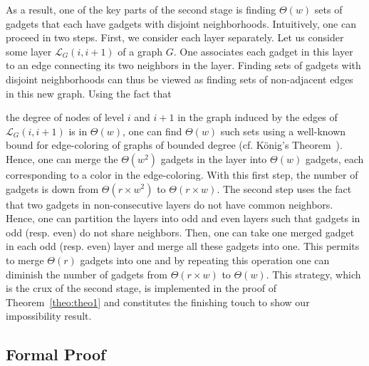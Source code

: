 \documentclass[11pt]{article}
\begin{document}
As a result, one of the key parts of the second stage is finding $\Theta(w)$ sets of gadgets that each have gadgets with disjoint neighborhoods. Intuitively, one can proceed in two steps. First, we consider each layer separately. Let us consider some layer $\mathcal{L}_G(i,i+1)$ of a graph $G$. One associates each gadget in this layer to an edge connecting its two neighbors in the layer. Finding sets of gadgets with disjoint neighborhoods can thus be viewed as finding sets of non-adjacent edges in this new graph. Using the fact that {the degree of nodes of level $i$ and $i+1$ in the graph induced by the edges of $\mathcal{L}_G(i,i+1)$ is in $\Theta(w)$, one can find $\Theta(w)$ such sets using a well-known bound for edge-coloring of graphs of bounded degree (cf. König's Theorem~\cite{konig1916}). Hence, one can merge the $\Theta(w^2)$ gadgets in the layer into $\Theta(w)$ gadgets, each corresponding to a color in the edge-coloring. With this first step, the number of gadgets is down from $\Theta(r\times w^2)$ to $\Theta(r\times w)$. The second step uses the fact that two gadgets in non-consecutive layers do not have common neighbors. Hence, one can partition the layers into odd and even layers such that gadgets in odd (resp. even) do not share neighbors. Then, one can take one merged gadget in each odd (resp. even) layer and merge all these gadgets into one. This permits to merge $\Theta(r)$ gadgets into one and by repeating this operation one can diminish the number of gadgets from $\Theta(r\times w)$ to $\Theta(w)$. This strategy, which is the crux of the second stage, is implemented in the proof of Theorem~\ref{theo:theo1} and constitutes the finishing touch to show our impossibility result.

\subsection{Formal Proof}
\label{sec:forproof}

}
\end{document}
